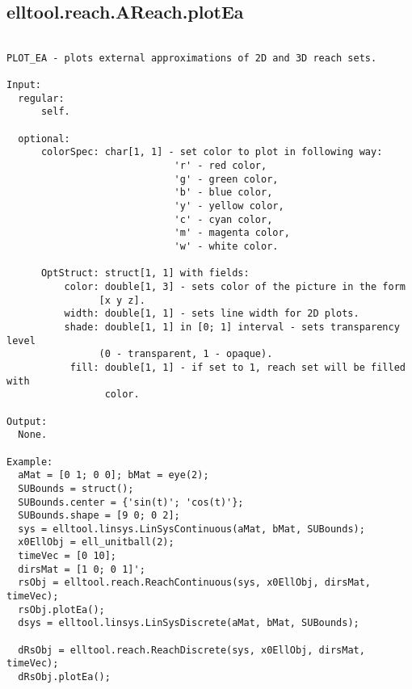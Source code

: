\subsection{\texorpdfstring{elltool.reach.AReach.plotEa}{plotEa}}\label{method:elltool.reach.AReach.plotEa}
\begin{verbatim}

PLOT_EA - plots external approximations of 2D and 3D reach sets.

Input:
  regular:
      self.

  optional:
      colorSpec: char[1, 1] - set color to plot in following way:
                             'r' - red color,
                             'g' - green color,
                             'b' - blue color,
                             'y' - yellow color,
                             'c' - cyan color,
                             'm' - magenta color,
                             'w' - white color.

      OptStruct: struct[1, 1] with fields:
          color: double[1, 3] - sets color of the picture in the form
                [x y z].
          width: double[1, 1] - sets line width for 2D plots.
          shade: double[1, 1] in [0; 1] interval - sets transparency level
                (0 - transparent, 1 - opaque).
           fill: double[1, 1] - if set to 1, reach set will be filled with
                 color.

Output:
  None.

Example:
  aMat = [0 1; 0 0]; bMat = eye(2);
  SUBounds = struct();
  SUBounds.center = {'sin(t)'; 'cos(t)'};
  SUBounds.shape = [9 0; 0 2];
  sys = elltool.linsys.LinSysContinuous(aMat, bMat, SUBounds);
  x0EllObj = ell_unitball(2);
  timeVec = [0 10];
  dirsMat = [1 0; 0 1]';
  rsObj = elltool.reach.ReachContinuous(sys, x0EllObj, dirsMat, timeVec);
  rsObj.plotEa();
  dsys = elltool.linsys.LinSysDiscrete(aMat, bMat, SUBounds);

  dRsObj = elltool.reach.ReachDiscrete(sys, x0EllObj, dirsMat, timeVec);
  dRsObj.plotEa();
\end{verbatim}
